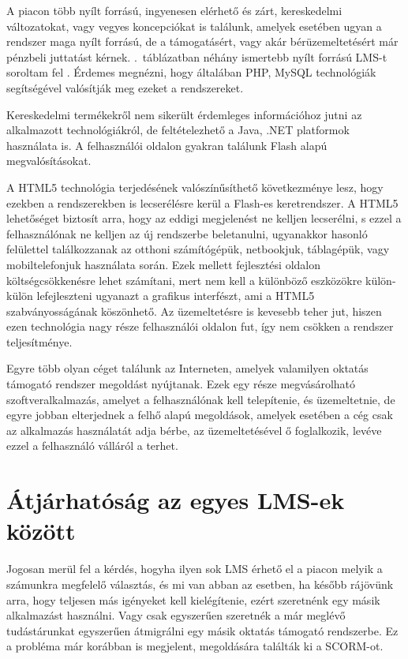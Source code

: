 A piacon több nyílt forrású, ingyenesen elérhető és zárt, kereskedelmi változatokat, vagy vegyes koncepciókat is találunk, amelyek esetében ugyan a rendszer maga nyílt forrású, de a támogatásért, vagy akár bérüzemeltetésért már pénzbeli juttatást kérnek. .~táblázatban néhány ismertebb nyílt forrású LMS-t soroltam fel \cite{lms}. Érdemes megnézni, hogy általában PHP, MySQL technológiák segítségével valósítják meg ezeket a rendszereket.



Kereskedelmi termékekről nem sikerült érdemleges információhoz jutni az alkalmazott technológiákról, de feltételezhető a Java, .NET platformok használata is. A felhasználói oldalon gyakran találunk Flash alapú megvalósításokat.

A HTML5 technológia terjedésének valószínűsíthető következménye lesz, hogy ezekben a rendszerekben is lecserélésre kerül a Flash-es keretrendszer. A HTML5 lehetőséget biztosít arra, hogy az eddigi megjelenést ne kelljen lecserélni, s ezzel a felhasználónak ne kelljen az új rendszerbe beletanulni, ugyanakkor hasonló felülettel találkozzanak az otthoni számítógépük, netbookjuk, táblagépük, vagy mobiltelefonjuk használata során. Ezek mellett fejlesztési oldalon költségcsökkenésre lehet számítani, mert nem kell a különböző eszközökre külön-külön lefejleszteni ugyanazt a grafikus interfészt, ami a HTML5 szabványosságának köszönhető. Az üzemeltetésre is kevesebb teher jut, hiszen ezen technológia nagy része felhasználói oldalon fut, így nem csökken a rendszer teljesítménye.

Egyre több olyan céget találunk az Interneten, amelyek valamilyen oktatás támogató rendszer megoldást nyújtanak. Ezek egy része megvásárolható szoftveralkalmazás, amelyet a felhasználónak kell telepítenie, és üzemeltetnie, de egyre jobban elterjednek a felhő alapú megoldások, amelyek esetében a cég csak az alkalmazás használatát adja bérbe, az üzemeltetésével ő foglalkozik, levéve ezzel a felhasználó válláról a terhet.

\section{Átjárhatóság az egyes LMS-ek között}

Jogosan merül fel a kérdés, hogyha ilyen sok LMS érhető el a piacon melyik a számunkra megfelelő választás, és mi van abban az esetben, ha később rájövünk arra, hogy teljesen más igényeket kell kielégítenie, ezért szeretnénk egy másik alkalmazást használni. Vagy csak egyszerűen szeretnék a már meglévő tudástárunkat egyszerűen átmigrálni egy másik oktatás támogató rendszerbe. Ez a probléma már korábban is megjelent, megoldására találták ki a SCORM-ot.

